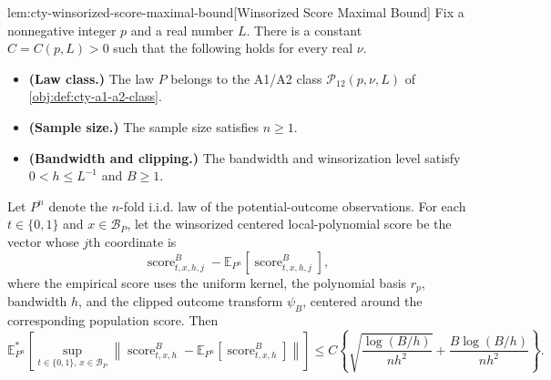 \documentclass[11pt]{article}
\begin{document}
\begin{lemmav}{lem:cty-winsorized-score-maximal-bound}[Winsorized Score Maximal Bound]
Fix a nonnegative integer \(p\) and a real number \(L\).  There is a constant
\(C=C(p,L)>0\) such that the following holds for every real \(\nu\).

\begin{itemize}
\item \textbf{(Law class.)} The law \(P\) belongs to the A1/A2 class
\(\mathcal P_{12}(p,\nu,L)\) of \cref{obj:def:cty-a1-a2-class}.
\item \textbf{(Sample size.)} The sample size satisfies \(n\geq 1\).
\item \textbf{(Bandwidth and clipping.)} The bandwidth and winsorization level satisfy
\(0<h\leq L^{-1}\) and \(B\geq 1\).
\end{itemize}

Let \(P^n\) denote the \(n\)-fold i.i.d. law of the potential-outcome observations.
For each \(t\in\{0,1\}\) and \(x\in\mathcal B_P\), let the winsorized centered local-polynomial
score be the vector whose \(j\)th coordinate is
\[
\operatorname{score}^{B}_{t,x,h,j}
  - \mathbb E_{P^n}\!\left[\operatorname{score}^{B}_{t,x,h,j}\right],
\]
where the empirical score uses the uniform kernel, the polynomial basis \(r_p\), bandwidth \(h\),
and the clipped outcome transform \(\psi_B\), centered around the corresponding population score.
Then
\[
\mathbb E_{P^n}^{*}\!\left[
\sup_{t\in\{0,1\},\,x\in\mathcal B_P}
\left\|
\operatorname{score}^{B}_{t,x,h}
-\mathbb E_{P^n}\!\left[\operatorname{score}^{B}_{t,x,h}\right]
\right\|
\right]
\leq
C\left\{
\sqrt{\frac{\log(B/h)}{n h^2}}
+
\frac{B\log(B/h)}{n h^2}
\right\}.
\]
\end{lemmav}
\end{document}
